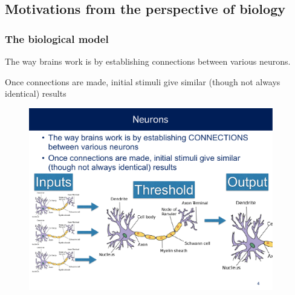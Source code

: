 \documentclass[hyperref={colorlinks=true}]{beamer}
\begin{document}
\subsection[Motivations from the perspective of biology]{Motivations from the perspective of biology}


\begin{frame}%
  \frametitle{The biological model}

  The way brains work is by establishing connections between various neurons.
  
  \mysp
  
  Once connections are made, initial stimuli give similar (though not always identical) results
  
  \begin{figure}
    \centering
    \includegraphics[width=0.95\textwidth]{NeuronModel.pdf}%
\end{figure}
    
\end{frame}

\end{document}
